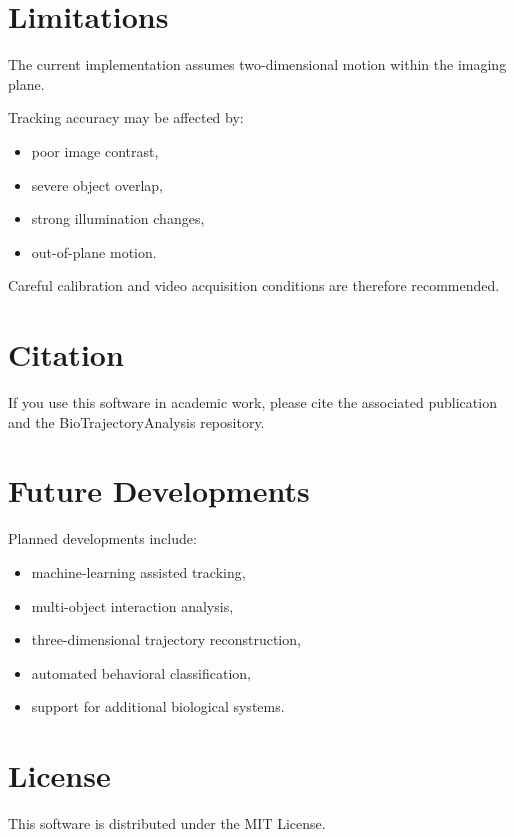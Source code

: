 \documentclass[11pt,a4paper]{article}
\begin{document}
\section{Limitations}

The current implementation assumes two-dimensional motion within the imaging plane.

Tracking accuracy may be affected by:

\begin{itemize}
\item poor image contrast,
\item severe object overlap,
\item strong illumination changes,
\item out-of-plane motion.
\end{itemize}

Careful calibration and video acquisition conditions are therefore recommended.

\section{Citation}

If you use this software in academic work, please cite the associated publication and the BioTrajectoryAnalysis repository.

\section{Future Developments}

Planned developments include:

\begin{itemize}
\item machine-learning assisted tracking,
\item multi-object interaction analysis,
\item three-dimensional trajectory reconstruction,
\item automated behavioral classification,
\item support for additional biological systems.
\end{itemize}

\section{License}

This software is distributed under the MIT License.
\end{document}
